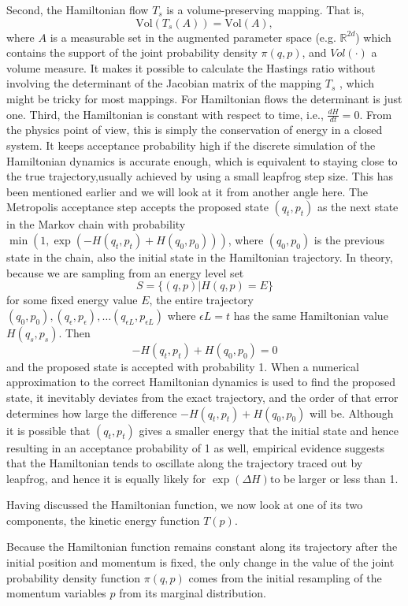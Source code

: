 \documentclass[12pt]{report}
\begin{document}
Second, the Hamiltonian flow $T_s$ is a volume-preserving mapping. That is, 
\[ \text{Vol}(T_s(A)) = \text{Vol}(A), \]
where $A$ is a measurable set in the augmented parameter space (e.g.
$\mathbb{R}^{2d}$) which contains
the support of 
the joint probability density $\pi(q,p)$, and $Vol(\cdot)$ a volume measure. 
It makes it
possible to calculate the Hastings ratio without involving the determinant of
the Jacobian matrix of the mapping $T_s$ , which might be tricky for most
mappings. For Hamiltonian flows the determinant is just one.
Third, the Hamiltonian is constant with respect to time, i.e., $\frac{dH}{dt} =
0$. From the physics point of view, this is simply the conservation of energy in
a closed system. It keeps acceptance probability high if the discrete simulation
of the Hamiltonian dynamics is accurate enough, which is equivalent to staying
close to the true trajectory,usually achieved by using a small leapfrog step size. This has been mentioned earlier
and we will look at it from another angle here. The Metropolis acceptance step
accepts the proposed state $(q_t,p_t)$ as the next state in the Markov chain
with probability $\min(1, \exp(-H(q_t,p_t) + H(q_0,p_0)))$, where $(q_0,p_0)$ is
the previous state in the chain, also the initial state in the Hamiltonian
trajectory. In theory, because we are sampling from an energy level set 
\[ S=\{(q,p)|H(q,p)=E\} \]
for some fixed energy value $E$, the entire trajectory
$(q_0,p_0),(q_\epsilon,p_\epsilon),\dots (q_{\epsilon L},p_{\epsilon L})$ where
$\epsilon L = t $ has the same Hamiltonian value $H(q_s,p_s)$. Then 
\[ -H(q_t,p_t) + H(q_0,p_0) = 0 \]
and the proposed state is accepted with probability 1. When a numerical
approximation to the correct Hamiltonian dynamics is used to find the proposed
state, it inevitably deviates from the exact trajectory, and the order of that
error determines how large the difference $ -H(q_t,p_t) + H(q_0,p_0)$ will be.
Although it is possible that $(q_t,p_t)$ gives a smaller energy that the initial
state and hence resulting in an acceptance probability of 1 as well, empirical
evidence suggests that the Hamiltonian tends to oscillate along the trajectory
traced out by leapfrog, and hence it is equally likely for $\exp(\Delta H)$to be
larger or less than 1. 

Having discussed the Hamiltonian function, we now look at one of its two
components, the kinetic energy function $T(p)$.  

Because the
Hamiltonian function remains constant along its trajectory after the initial
position and momentum is fixed, the only change in the value of the joint probability
density function $\pi(q,p)$ comes from the initial resampling of the momentum variables $p$
from its marginal distribution.
\end{document}
